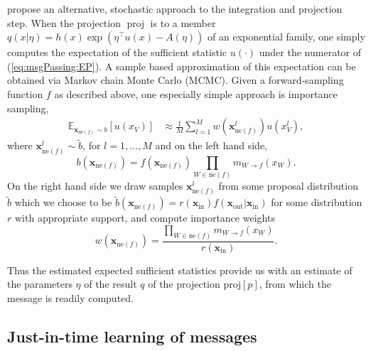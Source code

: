 \documentclass[english]{article}
\theoremstyle{plain}
\theoremstyle{plain}
\newcommand{\factor}{f}				%
\newcommand{\outV}{V}                         %
\newcommand{\fis}[1]{\mathrm{ne}(#1)}   	%
\newcommand{\fx}[1]{ \mathbf{x}_{\mathrm{ne}(#1)} }   	%
\newcommand{\xin}{\mathbf{x}_{ \mathrm{in} }} 			%
\newcommand{\xout}{\mathbf{x}_{ \mathrm{out} }}			%
\newcommand{\msg}[2]{m_{#1 \rightarrow #2}}			%
\newcommand{\projP}[1]{\mathrm{proj} \left [ #1 \right]}
\DeclareMathOperator*{\proj}{\text{proj}} %
\newcommand{\expectationE}[2]{ \mathbb{E}_{#2}  \left[ #1 \right] }
\newcommand{\wjnote}[1]{ }
\newcommand{\dsnote}[1]{}%
\begin{document}
\cite{Barthelme2011,Heess2013,Eslami2014} propose an alternative, stochastic approach to the integration and projection step.
When the projection $\proj$ is to a member $q(x|\eta)=h(x)\exp\left(\eta^{\top}u(x)-A(\eta)\right)$ of an exponential family, one simply computes the expectation of the sufficient statistic $u(\cdot)$ under the numerator of (\ref{eq:msgPassing:EP}).
A sample based approximation of this expectation can be obtained via Markov chain Monte Carlo (MCMC). 
Given a forward-sampling function $f$ as described above, one especially simple approach is importance sampling, 
\begin{align}
\expectationE{u(x_{\outV})}{\fx{\factor}\sim b }
&\approx \frac{1}{M} \sum_{l=1}^M w(\fx{\factor}^l) u(x_{\outV}^l),
\label{eq:msgIS}
\end{align}
where $\fx{\factor}^l \sim \tilde{b}$, for $l=1,\ldots,M$ and on the left hand side, 
%
\begin{equation*}
b(\fx{\factor}) = \factor (\fx{\factor}) \prod_{W \in \fis{\factor}} \msg{W}{\factor}(x_{W}). 
\end{equation*}
On the right hand side we draw samples $\fx{\factor}^l$ from some proposal distribution $\tilde{b}$ which we choose to be 
%
$\tilde{b}(\fx{\factor}) = r(\xin)\factor(\xout | \xin)$
%
for some distribution $r$ with appropriate support, and compute importance weights 
\begin{equation*}
w(\fx{\factor}) = \frac{\prod_{W \in \fis{\factor}} \msg{W}{\factor}(x_{W})}{r(\xin)}.
\end{equation*}

Thus the estimated expected sufficient statistics provide us with an estimate of the parameters $\eta$ of the result $q$ of the projection $\projP{p}$, from which the message is readily computed.\dsnote{isn't $\eta$ the actual message?}



\subsection{Just-in-time learning of messages}
\label{sec:EP:JIT}
\end{document}
